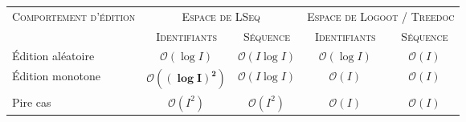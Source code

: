 
\small
\begin{tabularx}{1.2\textwidth}{@{}Xcccc@{}}

  \toprule
  \textsc{Comportement d'édition} & \multicolumn{2}{c}{\textsc{Espace de LSeq}} & \multicolumn{2}{c}{\textsc{Espace de Logoot} / \textsc{Treedoc}} \\ \cmidrule{2-3} \cmidrule{4-5} 
                   & \textsc{Identifiants} & \textsc{Séquence} & \textsc{Identifiants} & \textsc{Séquence} \\ \midrule
  Édition aléatoire & $\mathcal{O}(\log I)$ & $\mathcal{O}(I\log I)$ & $\mathcal{O}(\log I)$ & $\mathcal{O}(I)$\\
  Édition monotone & $\pmb{\mathcal{O}((\log I)^2)}$ & $\mathcal{O}(I \log I)$ & $\mathcal{O}(I)$ & $\mathcal{O}(I)$ \\
  Pire cas & $\mathcal{O}(I^2)$ & $\mathcal{O}(I^2)$ & $\mathcal{O}(I)$ & $\mathcal{O}(I)$  \\ \bottomrule
\end{tabularx}

